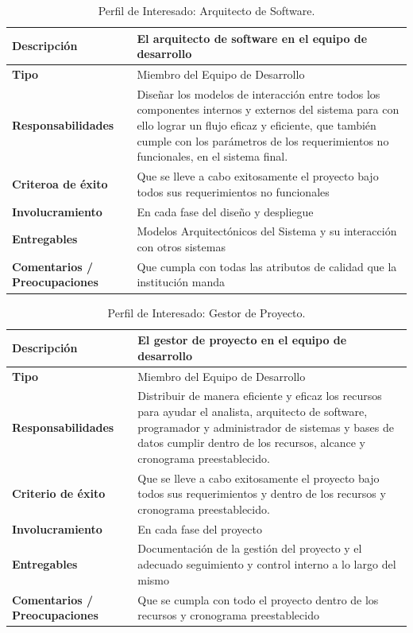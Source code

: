 \begin{table}[h!]
  \begin{tabular}{|p{}|p{}|}
    \hline
    \textbf{Descripción} & El arquitecto de software en el equipo de desarrollo \\
    \hline
    \textbf{Tipo} & Miembro del Equipo de Desarrollo \\
    \hline
    \textbf{Responsabilidades} & Diseñar los modelos de interacción entre todos los componentes internos y externos del sistema para con ello lograr un flujo eficaz y eficiente, que también cumple con los parámetros de los requerimientos no funcionales, en el sistema final. \\
    \hline
    \textbf{Criteroa de éxito} & Que se lleve a cabo exitosamente el proyecto bajo todos sus requerimientos no funcionales \\
    \hline
    \textbf{Involucramiento} & En cada fase del diseño y despliegue \\
    \hline
    \textbf{Entregables} & Modelos Arquitectónicos del Sistema y su interacción con otros sistemas \\
    \hline
    \textbf{Comentarios / Preocupaciones} & Que cumpla con todas las atributos de calidad que la institución manda \\
    \hline
  \end{tabular}
  \caption{Perfil de Interesado: Arquitecto de Software.}
  \label{per-inter-arquitecto}
\end{table}

\pagebreak

\begin{table}[h!]
  \begin{tabular}{|p{}|p{}|}
    \hline
    \textbf{Descripción} & El gestor de proyecto en el equipo de desarrollo \\
    \hline
    \textbf{Tipo} & Miembro del Equipo de Desarrollo \\
    \hline
    \textbf{Responsabilidades} & Distribuir de manera eficiente y eficaz los recursos para ayudar el analista, arquitecto de software, programador y administrador de sistemas y bases de datos cumplir dentro de los recursos, alcance y cronograma preestablecido. \\
    \hline
    \textbf{Criterio de éxito} & Que se lleve a cabo exitosamente el proyecto bajo todos sus requerimientos y dentro de los recursos y cronograma preestablecido. \\
    \hline
    \textbf{Involucramiento} & En cada fase del proyecto \\
    \hline
    \textbf{Entregables} & Documentación de la gestión del proyecto y el adecuado seguimiento y control interno a lo largo del mismo \\
    \hline
    \textbf{Comentarios / Preocupaciones} & Que se cumpla con todo el proyecto dentro de los recursos y cronograma preestablecido \\
    \hline
  \end{tabular}
  \caption{Perfil de Interesado: Gestor de Proyecto.}
  \label{per-inter-project-manager}
\end{table}

